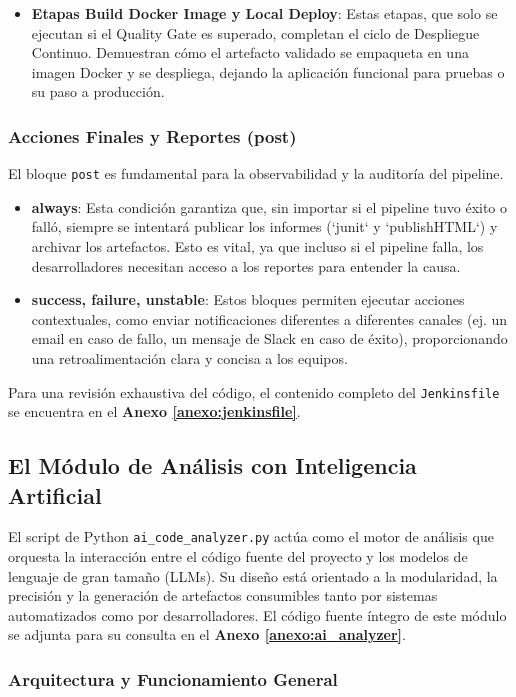 \begin{itemize}
    \item \textbf{Etapas Build Docker Image y Local Deploy}: Estas etapas, que solo se ejecutan si el Quality Gate es superado, completan el ciclo de Despliegue Continuo. Demuestran cómo el artefacto validado se empaqueta en una imagen Docker y se despliega, dejando la aplicación funcional para pruebas o su paso a producción.
\end{itemize}

\subsubsection{Acciones Finales y Reportes (post)}
El bloque \texttt{post} es fundamental para la observabilidad y la auditoría del pipeline.
\begin{itemize}
    \item \textbf{always}: Esta condición garantiza que, sin importar si el pipeline tuvo éxito o falló, siempre se intentará publicar los informes (`junit` y `publishHTML`) y archivar los artefactos. Esto es vital, ya que incluso si el pipeline falla, los desarrolladores necesitan acceso a los reportes para entender la causa.
    \item \textbf{success, failure, unstable}: Estos bloques permiten ejecutar acciones contextuales, como enviar notificaciones diferentes a diferentes canales (ej. un email en caso de fallo, un mensaje de Slack en caso de éxito), proporcionando una retroalimentación clara y concisa a los equipos.
\end{itemize}

Para una revisión exhaustiva del código, el contenido completo del \texttt{Jenkinsfile} se encuentra en el \textbf{Anexo \ref{anexo:jenkinsfile}}.

\subsection{El Módulo de Análisis con Inteligencia Artificial}
\label{sec:ai_analyzer_script}
El script de Python \texttt{ai\_code\_analyzer.py} actúa como el motor de análisis que orquesta la interacción entre el código fuente del proyecto y los modelos de lenguaje de gran tamaño (LLMs). Su diseño está orientado a la modularidad, la precisión y la generación de artefactos consumibles tanto por sistemas automatizados como por desarrolladores. El código fuente íntegro de este módulo se adjunta para su consulta en el \textbf{Anexo \ref{anexo:ai_analyzer}}.

\subsubsection{Arquitectura y Funcionamiento General}


